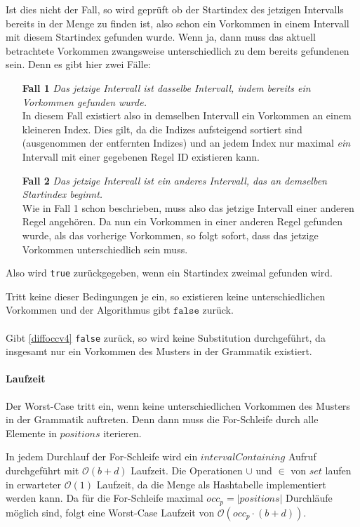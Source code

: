 Ist dies nicht der Fall, so wird geprüft ob der Startindex des jetzigen Intervalls bereits in der Menge zu finden ist, also schon ein Vorkommen in einem Intervall mit diesem Startindex gefunden wurde. Wenn ja, dann muss das aktuell betrachtete Vorkommen zwangsweise unterschiedlich zu dem bereits gefundenen sein. Denn es gibt hier zwei Fälle:
\begin{itemize}
    \item[\textbf{Fall 1}] \emph{Das jetzige Intervall ist dasselbe Intervall, indem bereits ein Vorkommen gefunden wurde.}\\
    In diesem Fall existiert also in demselben Intervall ein Vorkommen an einem kleineren Index. Dies gilt, da die Indizes aufsteigend sortiert sind (ausgenommen der entfernten Indizes) und an jedem Index nur maximal \emph{ein} Intervall mit einer gegebenen Regel ID existieren kann. 
    \item[\textbf{Fall 2}] \emph{Das jetzige Intervall ist ein anderes Intervall, das an demselben Startindex beginnt.}\\
    Wie in Fall 1 schon beschrieben, muss also das jetzige Intervall einer anderen Regel angehören. Da nun ein Vorkommen in einer anderen Regel gefunden wurde, als das vorherige Vorkommen, so folgt sofort, dass das jetzige Vorkommen unterschiedlich sein muss. 
\end{itemize}   
Also wird \texttt{true} zurückgegeben, wenn ein Startindex zweimal gefunden wird.

Tritt keine dieser Bedingungen je ein, so existieren keine unterschiedlichen Vorkommen und der Algorithmus gibt $\texttt{false}$ zurück.\\\\
Gibt \autoref{diffoccv4} \texttt{false} zurück, so wird keine Substitution durchgeführt, da insgesamt nur ein Vorkommen des Musters in der Grammatik existiert.

\paragraph{Laufzeit}

Der Worst-Case tritt ein, wenn keine unterschiedlichen Vorkommen des Musters in der Grammatik auftreten. Denn dann muss die For-Schleife durch alle Elemente in $positions$ iterieren.

In jedem Durchlauf der For-Schleife wird ein $intervalContaining$ Aufruf durchgeführt mit $\mathcal{O}(b + d)$ Laufzeit. Die Operationen $\cup$ und $\in$ von $set$ laufen in erwarteter $\mathcal{O}(1)$ Laufzeit, da die Menge als Hashtabelle implementiert werden kann.
Da für die For-Schleife maximal $occ_p = |positions|$ Durchläufe möglich sind, folgt eine Worst-Case Laufzeit von $\mathcal{O}(occ_p \cdot (b + d))$.  

